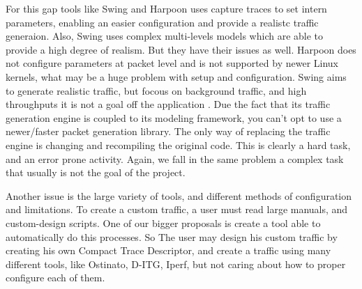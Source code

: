 For this gap tools like Swing and Harpoon uses capture traces to set intern parameters, enabling an easier configuration and provide a realistc traffic generaion. Also, Swing uses complex multi-levels models which are able to provide a high degree of realism\cite{swing-paper}. But they have their issues as well. Harpoon does not configure parameters at packet level\cite{harpoon-validation} and is not supported by newer Linux kernels, what may be a huge problem with setup and configuration. Swing\cite{swing-paper} aims to generate realistic traffic, but focous on background traffic, and high throughputs it is not a goal off the application\cite{swing-paper} \cite{legotg-paper}. Due the fact that its traffic generation engine is coupled to its modeling framework, you can't opt to use a newer/faster packet generation library. The only way of replacing the traffic engine is changing and recompiling the original code. This is clearly a hard task\cite{legotg-paper}, and an error prone activity. Again, we fall in the same problem a complex task that usually is not the goal of the project. 


Another issue is the large variety of tools, and different methods of configuration and limitations. To create a custom traffic, a user must read large manuals, and custom-design scripts. One of our bigger proposals is create a tool able to automatically do this processes. So The user may design his custom traffic by creating his own Compact Trace Descriptor, and create a traffic using many different tools, like Ostinato, D-ITG, Iperf, but not caring about how to proper configure each of them. 







